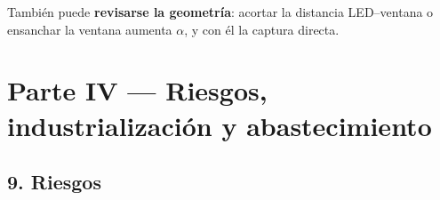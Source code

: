 \documentclass[11pt,a4paper]{article}
\begin{document}
También puede \textbf{revisarse la geometría}: acortar la distancia LED–ventana o ensanchar la ventana aumenta $\alpha$, y con él la captura directa.

\clearpage

\section*{Parte IV — Riesgos, industrialización y abastecimiento}


\subsection*{9. Riesgos}
\end{document}

